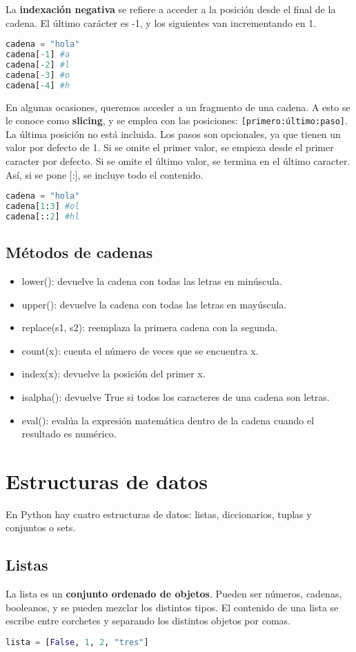 La \textbf{indexación negativa} se refiere a acceder a la posición desde el final de la cadena. El último carácter es -1, y los siguientes van incrementando en 1. 
\begin{lstlisting}[language=Python]
cadena = "hola"
cadena[-1] #a
cadena[-2] #l
cadena[-3] #o
cadena[-4] #h
\end{lstlisting}

En algunas ocasiones, queremos acceder a un fragmento de una cadena. A esto se le conoce como \textbf{slicing}, y se emplea con las posiciones: \texttt{[primero:último:paso]}. La última posición no está incluida. Los pasos son opcionales, ya que tienen un valor por defecto de 1. Si se omite el primer valor, se empieza desde el primer caracter por defecto. Si se omite el último valor, se termina en el último caracter. Así, si se pone [:], se incluye todo el contenido.
\begin{lstlisting}[language=Python]
cadena = "hola"
cadena[1:3] #ol
cadena[::2] #hl
\end{lstlisting}

\subsection{Métodos de cadenas}
\begin{itemize}
\item lower(): devuelve la cadena con todas las letras en minúscula.
\item upper(): devuelve la cadena con todas las letras en mayúscula.
\item replace(s1, s2): reemplaza la primera cadena con la segunda.
\item count(x): cuenta el número de veces que se encuentra x.
\item index(x): devuelve la posición del primer x.
\item isalpha(): devuelve True si todos los caracteres de una cadena son letras.
\item eval(): evalúa la expresión matemática dentro de la cadena cuando el resultado es numérico.
\end{itemize}

\section{Estructuras de datos}
En Python hay cuatro estructuras de datos: listas, diccionarios, tuplas y conjuntos o sets. 

\subsection{Listas}
La lista es un \textbf{conjunto ordenado de objetos}. Pueden ser números, cadenas, booleanos, y se pueden mezclar los distintos tipos. El contenido de una lista se escribe entre corchetes y separando los distintos objetos por comas. 
\begin{lstlisting}[language=Python]
lista = [False, 1, 2, "tres"]
\end{lstlisting}

